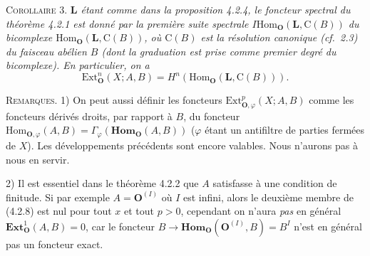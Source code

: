 \textsc{Corollaire 3.} \textit{$\mathbf{L}$ étant comme dans la
proposition \textup{4.2.4}, le foncteur spectral du théorème \textup{4.2.1} est donné par la
première suite spectrale
$I\mathrm{Hom}_{\mathbf O}(\mathbf{L},{\mathrm C}(B))$ du bicomplexe
$\mathrm{Hom}_{\mathbf O}(\mathbf{L},{\mathrm C}(B))$, où ${\mathrm C}(B)$ est la résolution canonique
\textup{(}cf.\ \textup{2.3)} du faisceau abélien $B$ \textup{(}dont la graduation est prise comme premier
degré du bicomplexe\textup{)}. En particulier, on a}
\[
\mathrm{Ext}_{\mathbf O}^n(X;A,B)=
H^n(\mathrm{Hom}_{\mathbf O}(\mathbf{L},{\mathrm C}(B))).
\]

\textsc{Remarques.} 1) On peut aussi définir les foncteurs
$\mathrm{Ext}_{{\mathbf O},\varphi}^p(X;A,B)$ comme les foncteurs dérivés droits, par
rapport à $B$, du foncteur
$\mathrm{Hom}_{{\mathbf O},\varphi}(A,B)=
\Gamma_\varphi(\mathbf{Hom}_{\mathbf O}(A,B))$ ($\varphi$ étant un antifiltre de parties
fermées de $X$). Les développements précédents sont encore valables. Nous
n'aurons pas à nous en servir.

2) Il est essentiel dans le théorème 4.2.2 que $A$ satisfasse à une condition
de finitude. Si par exemple $A={\mathbf O}^{(I)}$ où $I$ est infini, alors le deuxième
membre de (4.2.8) est nul pour tout $x$ et tout $p>0$, cependant on n'aura
\textit{pas} en général $\mathbf{Ext}_{\mathbf O}^1(A,B)=0$, car le foncteur
$B\to\mathbf{Hom}_{\mathbf O}({\mathbf O}^{(I)},B)=B^I$ n'est en général pas un foncteur
exact.

